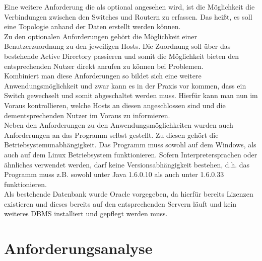 Eine weitere Anforderung die als optional angesehen wird, ist die Möglichkeit die Verbindungen zwischen den Switches und Routern zu erfassen. Das heißt, es soll eine Topologie anhand der Daten erstellt werden können.\\
Zu den optionalen Anforderungen gehört die Möglichkeit einer Benutzerzuordnung zu den jeweiligen Hosts. Die Zuordnung soll über das bestehende Active Directory passieren und somit die Möglichkeit bieten den entsprechenden Nutzer direkt anrufen zu können bei Problemen.\\
Kombiniert man diese Anforderungen so bildet sich eine weitere Anwendungsmöglichkeit und zwar kann es in der Praxis vor kommen, dass ein Switch gewechselt und somit abgeschaltet werden muss. Hierfür kann man nun im Voraus kontrollieren, welche Hosts an diesen angeschlossen sind und die dementsprechenden Nutzer im Voraus zu informieren.\\

Neben den Anforderungen zu den Anwendungsmöglichkeiten wurden auch Anforderungen an das Programm selbst gestellt.
Zu diesen gehört die Betriebsystemunabhängigkeit.
Das Programm muss sowohl auf dem Windows, als auch auf dem Linux Betriebsystem funktionieren. Sofern Interpretersprachen oder ähnliches verwendet werden, darf keine Versionsabhängigkeit bestehen, d.h. das Programm muss z.B. sowohl unter Java 1.6.0.10 als auch unter 1.6.0.33 funktionieren.\\
Als bestehende Datenbank wurde Oracle vorgegeben, da hierfür bereits Lizenzen existieren und dieses bereits auf den entsprechenden Servern läuft und kein weiteres DBMS installiert und gepflegt werden muss.\\

\section{Anforderungsanalyse}
\label{sec:anfanalyse}

